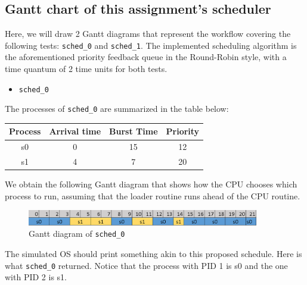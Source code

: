 \documentclass[a4paper]{article}
\numberwithin{equation}{section}
\begin{document}
\subsection{Gantt chart of this assignment's scheduler}
Here, we will draw 2 Gantt diagrams that represent the workflow covering the following tests: \texttt{sched_0} and \texttt{sched_1}.
The implemented scheduling algorithm is the aforementioned priority feedback queue in the Round-Robin style, with a time quantum of 2 time units for both tests.

\begin{itemize}
  \item \texttt{sched_0}
\end{itemize}

The processes of \texttt{sched_0} are summarized in the table below:

\begin{table}[H]
  \centering
  \begin{tabular}{cccc}
    \toprule
    Process & Arrival time & Burst Time & Priority \\
    \midrule
    s0      & 0            & 15         & 12       \\
    s1      & 4            & 7          & 20       \\
    \bottomrule
  \end{tabular}
\end{table}

We obtain the following Gantt diagram that shows how the CPU chooses which process to run, assuming that the loader routine runs ahead of the CPU routine.

\begin{figure}[H]
  \centering
  \includegraphics[width=0.9\textwidth]{sched_0.png}
  \caption{Gantt diagram of \texttt{sched_0}}
\end{figure}

The simulated OS should print something akin to this proposed schedule.
Here is what \texttt{sched_0} returned.
Notice that the process with PID 1 is s0 and the one with PID 2 is s1.
\end{document}
